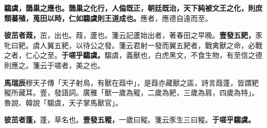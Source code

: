 
\textbf{騶虞，鵲巢之應也。鵲巢之化行，人倫既正，朝廷既治，天下純被文王之化，則庶類蕃殖，蒐田以時，仁如騶虞則王道成也。}{\footnotesize 應者，應德自遠而至。}

\textbf{彼茁者葭，}{\footnotesize 茁，出也。葭，蘆也。箋云記蘆始出者，著春田之早晚。}\textbf{壹發五豝，}{\footnotesize 豕牝曰豝。虞人翼五豝，以待公之發。箋云君射一發而翼五豝者，戰禽獸之命，必戰之者，仁心之至。}\textbf{于嗟乎騶虞。}{\footnotesize 騶虞，義獸也，白虎黑文，不食生物，有至信之德則應之。箋云于嗟者，美之也。}

\begin{quoting}\textbf{馬瑞辰}穆天子傳「天子射鳥，有獸在葭中」，是葭亦藏獸之區，詩言葭蓬，皆謂豝豵所藏耳。壹，發語詞。廣雅「獸一歲為豵，二歲為豝，三歲為肩，四歲為特」。魯說、韓說「騶虞，天子掌馬獸官」。\end{quoting}

\textbf{彼茁者蓬，}{\footnotesize 蓬，草名也。}\textbf{壹發五豵，}{\footnotesize 一歲曰豵。箋云豕生三曰豵。}\textbf{于嗟乎騶虞。}

